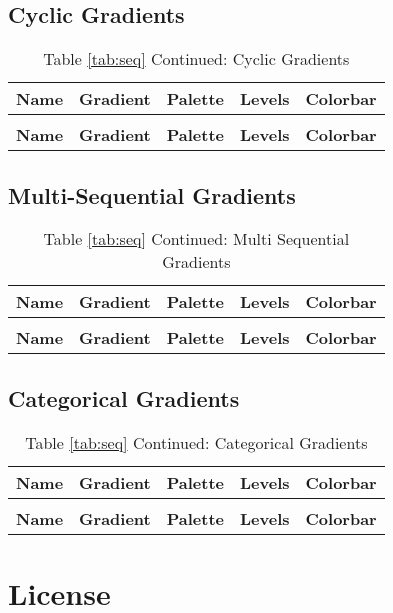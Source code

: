 \documentclass[a4paper]{article}
\begin{document}
\subsection{Cyclic Gradients}
\renewcommand{\arraystretch}{2}
\begin{longtable}{p{}p{}p{}p{}p{}}
	\caption{Cyclic Gradients} \label{tab:cyc}                                                 \\
	\hline
	\textbf{Name} & \textbf{Gradient} & \textbf{Palette} & \textbf{Levels} & \textbf{Colorbar} \\ \hline \endfirsthead
	\caption*{Table \ref{tab:seq} Continued: Cyclic Gradients}                                 \\
	\hline
	\textbf{Name} & \textbf{Gradient} & \textbf{Palette} & \textbf{Levels} & \textbf{Colorbar} \\ \hline \endhead
	
\end{longtable}
\newpage
\subsection{Multi-Sequential Gradients}
\renewcommand{\arraystretch}{2}
\begin{longtable}{p{}p{}p{}p{}p{}}
	\caption{Multi-Sequential Gradients} \label{tab:msq}                                       \\
	\hline
	\textbf{Name} & \textbf{Gradient} & \textbf{Palette} & \textbf{Levels} & \textbf{Colorbar} \\ \hline \endfirsthead
	\caption*{Table \ref{tab:seq} Continued: Multi Sequential Gradients}                       \\
	\hline
	\textbf{Name} & \textbf{Gradient} & \textbf{Palette} & \textbf{Levels} & \textbf{Colorbar} \\ \hline \endhead
	
\end{longtable}
\newpage
\subsection{Categorical Gradients}
\renewcommand{\arraystretch}{2}
\begin{longtable}{p{}p{}p{}p{}p{}}
	\caption{Categorical Gradients} \label{tab:cat}                                            \\
	\hline
	\textbf{Name} & \textbf{Gradient} & \textbf{Palette} & \textbf{Levels} & \textbf{Colorbar} \\ \hline \endfirsthead
	\caption*{Table \ref{tab:seq} Continued: Categorical Gradients}                            \\
	\hline
	\textbf{Name} & \textbf{Gradient} & \textbf{Palette} & \textbf{Levels} & \textbf{Colorbar} \\ \hline \endhead
	
\end{longtable}
\newpage
\section{License}

\newpage


\end{document}
